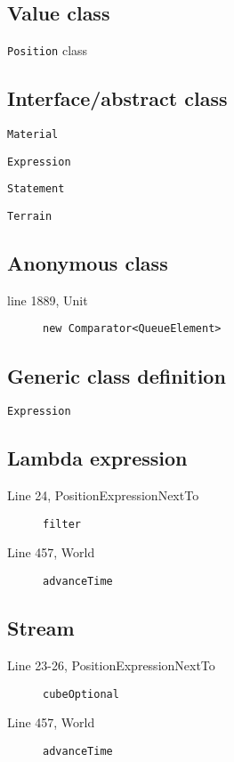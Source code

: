 \documentclass[]{article}
\begin{document}
\subsection{Value class}
	\begin{description}
		\item \texttt{Position} class
	\end{description}
	
\subsection{Interface/abstract class}
	\begin{description}
		\item \texttt{Material}
		\item \texttt{Expression}
		\item \texttt{Statement}
		\item \texttt{Terrain}
	\end{description}
	
\subsection{Anonymous class}
	\begin{description}
		\item[line 1889, Unit] \texttt{new Comparator<QueueElement>}
	\end{description}
	
\subsection{Generic class definition}
	\begin{description}
		\item \texttt{Expression}
	\end{description}
	
\subsection{Lambda expression}
	\begin{description}
		\item[Line 24, PositionExpressionNextTo] \texttt{filter}
		\item[Line 457, World] \texttt{advanceTime}
	\end{description}
	
\subsection{Stream}
	\begin{description}
		\item[Line 23-26, PositionExpressionNextTo] \texttt{cubeOptional}
		\item[Line 457, World] \texttt{advanceTime}
	\end{description}
	
\end{document}
